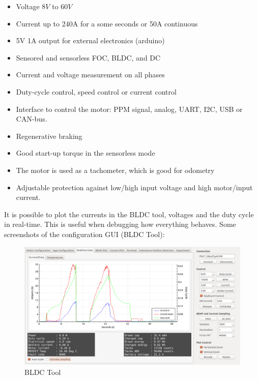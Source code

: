 \begin{itemize}
\begin{itemize}\itemsep -10pt
\item Voltage $8V$ to $60V$
\item Current up to 240A for a some seconds or 50A continuous
\item 5V 1A output for external electronics (arduino)
\item Sensored and sensorless FOC, BLDC, and DC
\item Current and voltage measurement on all phases
\item Duty-cycle control, speed control or current control
\item Interface to control the motor: PPM signal, analog, UART, I2C, USB  or CAN-bus.
\item Regenerative braking
\item Good start-up torque in the sensorless mode
\item The motor is used as a tachometer, which is good for odometry
\item Adjustable protection against low/high input voltage and high motor/input current.
\end{itemize}
\end{itemize}


It is possible to plot the currents in the BLDC tool, voltages and the duty cycle in real-time. This is useful when debugging how everything behaves. Some screenshots of the configuration GUI (BLDC Tool):
\begin{figure}[h!]
	\includegraphics[width=1\linewidth]{figs/05/RT_Data}
	\caption{BLDC Tool}
\end{figure}

